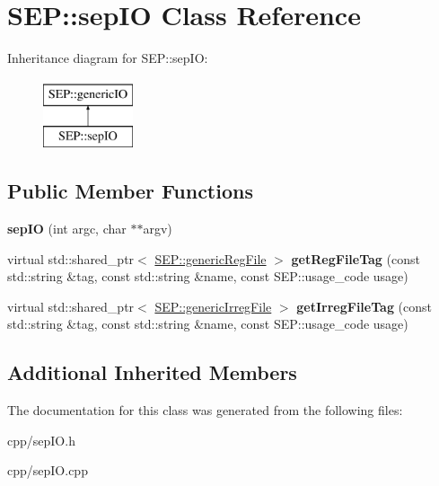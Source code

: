 \hypertarget{class_s_e_p_1_1sep_i_o}{}\section{S\+EP\+:\+:sep\+IO Class Reference}
\label{class_s_e_p_1_1sep_i_o}
Inheritance diagram for S\+EP\+:\+:sep\+IO\+:\begin{figure}[H]
\begin{center}
\leavevmode
\includegraphics[height=2.000000cm]{class_s_e_p_1_1sep_i_o}
\end{center}
\end{figure}
\subsection*{Public Member Functions}
\begin{DoxyCompactItemize}
\item 
\mbox{\label{class_s_e_p_1_1sep_i_o_a6e24f12ab30017f920c23ac7d571b292}} 
{\bfseries sep\+IO} (int argc, char $\ast$$\ast$argv)
\item 
\mbox{\label{class_s_e_p_1_1sep_i_o_ac17d965c18da7399679f08c4108985c4}} 
virtual std\+::shared\+\_\+ptr$<$ \hyperlink{class_s_e_p_1_1generic_reg_file}{S\+E\+P\+::generic\+Reg\+File} $>$ {\bfseries get\+Reg\+File\+Tag} (const std\+::string \&tag, const std\+::string \&name, const S\+E\+P\+::usage\+\_\+code usage)
\item 
\mbox{\label{class_s_e_p_1_1sep_i_o_a522e3de74b7d9bb042b5ce99e9b35880}} 
virtual std\+::shared\+\_\+ptr$<$ \hyperlink{class_s_e_p_1_1generic_irreg_file}{S\+E\+P\+::generic\+Irreg\+File} $>$ {\bfseries get\+Irreg\+File\+Tag} (const std\+::string \&tag, const std\+::string \&name, const S\+E\+P\+::usage\+\_\+code usage)
\end{DoxyCompactItemize}
\subsection*{Additional Inherited Members}


The documentation for this class was generated from the following files\+:\begin{DoxyCompactItemize}
\item 
cpp/sep\+I\+O.\+h\item 
cpp/sep\+I\+O.\+cpp\end{DoxyCompactItemize}

